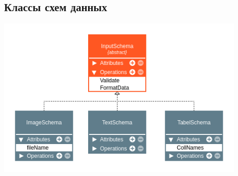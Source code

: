 \subsection{Классы схем данных}

\begin{frame}
    \includegraphics[width=0.9\textwidth]{./inputschema.png}
\end{frame}


